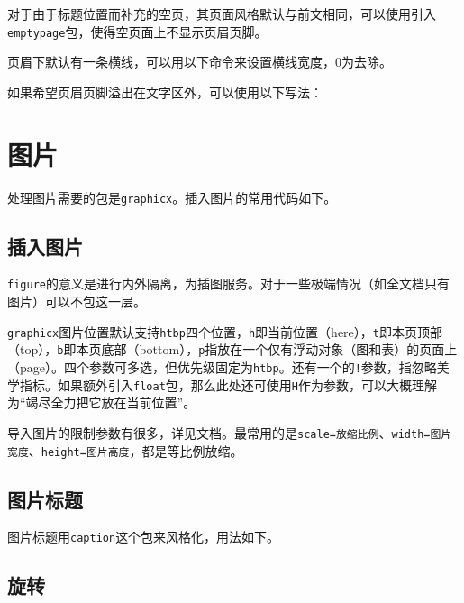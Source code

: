\documentclass[10pt,openany]{book}
\begin{document}
对于由于标题位置而补充的空页，其页面风格默认与前文相同，可以使用引入\texttt{emptypage}包，使得空页面上不显示页眉页脚。

页眉下默认有一条横线，可以用以下命令来设置横线宽度，0为去除。



如果希望页眉页脚溢出在文字区外，可以使用以下写法：



\chapter{图片}

处理图片需要的包是\texttt{graphicx}。插入图片的常用代码如下。

\section{插入图片}



\texttt{figure}的意义是进行内外隔离，为插图服务。对于一些极端情况（如全文档只有图片）可以不包这一层。

\texttt{graphicx}图片位置默认支持\texttt{htbp}四个位置，\texttt{h}即当前位置（here），\texttt{t}即本页顶部（top），\texttt{b}即本页底部（bottom），\texttt{p}指放在一个仅有浮动对象（图和表）的页面上（page）。四个参数可多选，但优先级固定为\texttt{htbp}。还有一个的\texttt{!}参数，指忽略美学指标。如果额外引入\texttt{float}包，那么此处还可使用\texttt{H}作为参数，可以大概理解为“竭尽全力把它放在当前位置”。

导入图片的限制参数有很多，详见文档。最常用的是\texttt{scale=放缩比例}、\texttt{width=图片宽度}、\texttt{height=图片高度}，都是等比例放缩。

\section{图片标题}

图片标题用\texttt{caption}这个包来风格化，用法如下。



\section{旋转}
\end{document}
